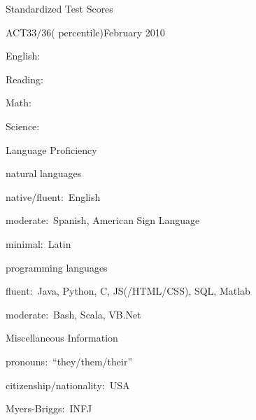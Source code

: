 \documentclass{resume}
\begin{document}
{\begin{rSection}{Standardized Test Scores}
  \begin{rSubSection}{ACT\hspace{8.75em}$33/36$\hspace{5.3em}\normalfont( percentile)}{February 2010}{}{}
  \item English:~\tab\tab{}\tab\tab{}
  \item Reading:~\tab\tab{}\tab\tab{}
  \item Math:~\tab\tab\tab{}\tab\tab{}
  \item Science:~\tab\tab{}\tab\tab{}
  \end{rSubSection}

  \end{rSection}





  \begin{rSection}{Language Proficiency}

  \begin{rSubSection}{\normalfont natural languages}{}{}{}
  \item native/fluent:~English
  \item moderate:~Spanish, American Sign Language
  \item minimal:~Latin
  \end{rSubSection}

  \begin{rSubSection}{\normalfont programming languages}{}{}{}
  \item fluent:~Java, Python, C, JS(/HTML/CSS), SQL, Matlab
  \item moderate:~Bash, Scala, VB.Net
  \end{rSubSection}

  \end{rSection}





  \begin{rSection}{Miscellaneous Information}

  pronouns:~``they/them/their''

  citizenship/nationality:~USA

  Myers-Briggs:~INFJ


\end{rSection}}
\end{document}
